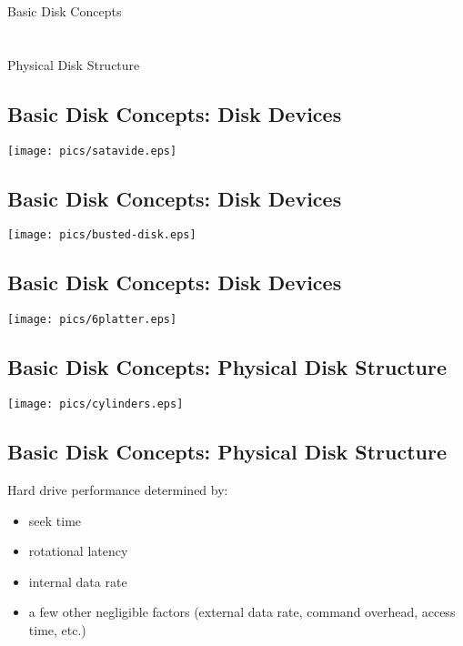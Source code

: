 \documentclass[xga]{xdvislides}
\begin{document}
\newpage
\vspace*{\fill}
\begin{center}
	\Hugesize
		Basic Disk Concepts\\ [1em]
	\hspace*{5mm}
	\blueline\\
	\hspace*{5mm}\\
		Physical Disk Structure
\end{center}
\vspace*{\fill}

\subsection{Basic Disk Concepts: Disk Devices}
\vfill
	\begin{center}
		\texttt{[image: pics/satavide.eps]} \\
	\end{center}
\vfill


\subsection{Basic Disk Concepts: Disk Devices}
	\begin{center}
		\texttt{[image: pics/busted-disk.eps]} \\
	\end{center}

\subsection{Basic Disk Concepts: Disk Devices}
\vfill
	\begin{center}
		\texttt{[image: pics/6platter.eps]} \\
	\end{center}
\vfill

\subsection{Basic Disk Concepts: Physical Disk Structure}
\vfill
	\begin{center}
		\texttt{[image: pics/cylinders.eps]} \\
	\end{center}
\vfill

\subsection{Basic Disk Concepts: Physical Disk Structure}
Hard drive performance determined by:
\begin{itemize}
	\item seek time
	\item rotational latency
	\item internal data rate
	\item a few other negligible factors (external data rate, command
		overhead, access time, etc.)
\end{itemize}
\end{document}
